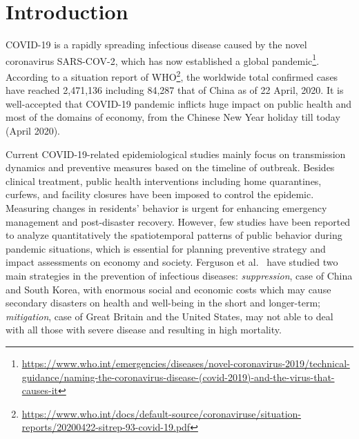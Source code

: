 \documentclass[ijgi,submit,moreauthors,pdftex]{Definitions/mdpi}
\begin{document}
\section{Introduction}
COVID-19 is a rapidly spreading infectious disease caused by the novel coronavirus SARS-COV-2, which has now established a global pandemic\footnote{\url{https://www.who.int/emergencies/diseases/novel-coronavirus-2019/technical-guidance/naming-the-coronavirus-disease-(covid-2019)-and-the-virus-that-causes-it}}.
According to a situation report of WHO\footnote{\url{https://www.who.int/docs/default-source/coronaviruse/situation-reports/20200422-sitrep-93-covid-19.pdf}}, the worldwide total confirmed cases have reached 2,471,136 including 84,287 that of China as of 22 April, 2020.
It is well-accepted that COVID-19 pandemic inflicts huge impact on public health and most of the domains of economy, from the Chinese New Year holiday till today (April 2020).

Current COVID-19-related epidemiological studies mainly focus on transmission dynamics \cite{li2020early,pitzer2009demographic} and preventive measures \cite{chinazzi2020effect,van2006today} based on the timeline of outbreak.
Besides clinical treatment, public health interventions including home quarantines, curfews, and facility closures have been imposed to control the epidemic.
Measuring changes in residents' behavior is urgent for enhancing emergency management and post-disaster recovery.
However, few studies have been reported to analyze quantitatively the spatiotemporal patterns of public behavior during pandemic situations, which is essential for planning preventive strategy and impact assessments on economy and society.
Ferguson et al.\ \cite{ferguson2020report} have studied two main strategies in the prevention of infectious diseases: \textit{suppression}, case of China and South Korea, with enormous social and economic costs which may cause secondary disasters on health and well-being in the short and longer-term;
\textit{mitigation}, case of Great Britain and the United States, may not able to deal with all those with severe disease and resulting in high mortality.
\end{document}
